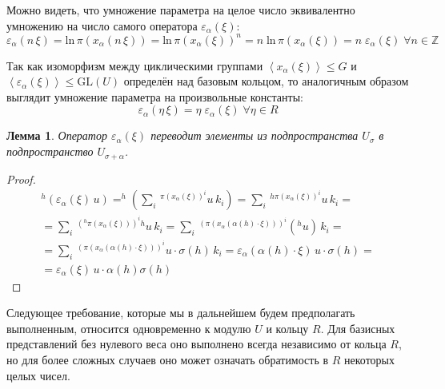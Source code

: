 \documentclass[12pt]{matmex-diploma}
\theoremstyle{mystyleni}
\theoremstyle{mystyle}
\newtheorem{lm}{Лемма}
\newcommand{\Z}{\mathbb{Z}}
\renewcommand{\le}{\leqslant}
\begin{document}
Можно видеть, что умножение параметра на целое число эквивалентно умножению на число самого оператора $\varepsilon_\alpha(\xi)$:
$$ \varepsilon_\alpha(n \, \xi) = \mathrm{ln} \, \pi(x_\alpha(n \, \xi)) = \mathrm{ln} \, \pi(x_\alpha(\xi))^n = n \; \mathrm{ln} \, \pi(x_\alpha(\xi)) = n \; \varepsilon_\alpha(\xi) \; \forall n \in \Z
$$

Так как изоморфизм  между циклическими группами $\left<x_\alpha(\xi)\right> \le G$ и $\left<\varepsilon_\alpha(\xi)\right> \le \mathrm{GL}(U)$ определён над базовым кольцом, то аналогичным образом выглядит умножение параметра на произвольные константы:
$$
\varepsilon_\alpha(\eta \, \xi) = \eta \; \varepsilon_\alpha(\xi) \; \forall \eta \in R
$$

\begin{lm}
Оператор $\varepsilon_\alpha(\xi)$ переводит элементы из подпространства $U_\sigma$ в подпространство $U_{\sigma+\alpha}$.
\end{lm}
\begin{proof}
\begin{multline*}
^h(\varepsilon_\alpha(\xi) \, u) =
^h\left(\sum_i \, {^{\pi(x_\alpha(\xi))^i}u \, k_i}\right) = 
\sum_i \, {^{h \pi(x_\alpha(\xi))^i}u \, k_i} = \\ =
\sum_i \, {^{(^h \pi(x_\alpha(\xi)))^i h}u \, k_i} = 
\sum_i \, {^{(\pi(x_\alpha(\alpha(h)\cdot\xi)))^i} \left(^h u\right) \, k_i} =\\=
\sum_i \, {^{(\pi(x_\alpha(\alpha(h)\cdot\xi)))^i} u \cdot \sigma(h) \, k_i} =
\varepsilon_\alpha(\alpha(h)\cdot\xi) \, u \cdot \sigma(h) = \\ =
\varepsilon_\alpha(\xi) \, u \cdot \alpha(h)\sigma(h)
\end{multline*}
\end{proof}

Следующее требование, которые мы в дальнейшем будем предполагать выполненным, относится одновременно к модулю $U$ и кольцу $R$. Для базисных представлений без нулевого веса оно выполнено всегда независимо от кольца $R$, но для более сложных случаев оно может означать обратимость в $R$ некоторых целых чисел.
\end{document}
